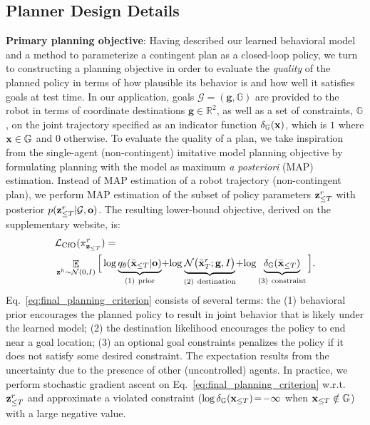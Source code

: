 \documentclass[conference]{IEEEtran}
\newcommand{\mypara}[1]{\vspace{1mm}\noindent\textbf{#1}:}
\newcommand{\ours}[0]{{CfO}}
\begin{document}
\subsection{Planner Design Details}\label{sec:planner_design}
\vspace{-.5em}
\mypara{Primary planning objective} Having described our learned behavioral model and a method to parameterize a contingent plan as a closed-loop policy, we turn to constructing a planning objective in order to evaluate the \emph{quality} of the planned policy in terms of how plausible its behavior is and how well it satisfies goals at test time. In our application, goals $\mathcal G=(\mathbf{g},\mathbb G)$ are provided to the robot in terms of coordinate destinations $\mathbf{g} \in \mathbb R^2$, as well as a set of constraints, $\mathbb G$, on the joint trajectory specified as an indicator function $\delta_{\mathbb{G}}(\mathbf{x})$, which is $1$ where $\mathbf{x}\in\mathbb G$ and $0$ otherwise. To evaluate the quality of a plan, we take inspiration from the single-agent (non-contingent) imitative model planning objective \citep{rhinehart2020deep} by formulating planning with the model as maximum \emph{a posteriori} (MAP) estimation. Instead of MAP estimation of a robot trajectory (non-contingent plan), we perform MAP estimation of the subset of policy parameters $\mathbf{z}_{\leq T}^r$ with posterior $p(\mathbf{z}_{\leq T}^r|\mathcal G, {\mathbf{o}})$. The resulting lower-bound objective, derived on the supplementary website, is:
 \begin{align}
    &\mathcal{L}_\text{\ours}(\pi^r_{\bz_{\leq T}})
    =  \label{eq:final_planning_criterion}\\
    &\mathop{\E}_{\bz^h \sim \mathcal{N}(0, I)} \Big[
    \log \underbrace{q_\theta(\bar{\bx}_{\leq T}|{\bo})}_{(1)~\text{prior}}\!+\!\log  \underbrace{\mathcal N\big(\bar{\bx}^r_T; \mathbf{g}, I
    \big)}_{(2)~\text{destination}}\!+\!\log \underbrace{\delta_{\mathbb G}(\bar{\bx}_{\leq T})}_{(3)~\text{constraint}} 
    \Big].\notag
 \end{align}
Eq.~\ref{eq:final_planning_criterion} consists of several terms: the (1) behavioral prior encourages the planned policy to result in joint behavior that is likely under the learned model; (2) the destination likelihood encourages the policy to end near a goal location; (3) an optional goal constraints penalizes the policy if it does not satisfy some desired constraint. The expectation results from the uncertainty due to the presence of other (uncontrolled) agents. In practice, we perform stochastic gradient ascent on Eq.~\ref{eq:final_planning_criterion} w.r.t. $\mathbf{z}_{\leq T}^r$ and approximate a violated constraint ($\log \delta_{\mathbb G}(\mathbf{x}_{\leq T})\!=\!-\infty$ when $\mathbf{x}_{\leq T}\notin\mathbb G$) with a large negative value.
\end{document}
